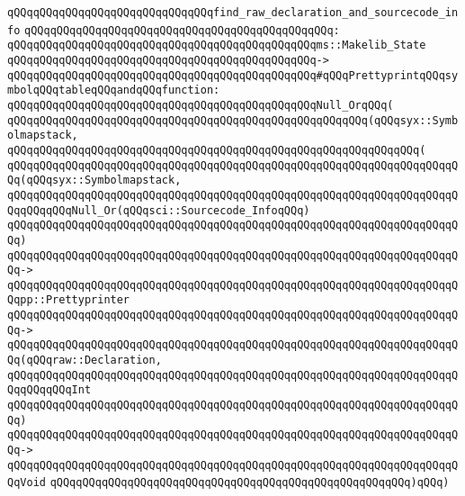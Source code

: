 \newline
\verb|qQQqqQQqqQQqqQQqqQQqqQQqqQQqqQQqfind_raw_declaration_and_sourcecode_info|\newline
\verb|qQQqqQQqqQQqqQQqqQQqqQQqqQQqqQQqqQQqqQQqqQQqqQQq:|\newline
\verb|qQQqqQQqqQQqqQQqqQQqqQQqqQQqqQQqqQQqqQQqqQQqqQQqms::Makelib_State|\newline
\verb|qQQqqQQqqQQqqQQqqQQqqQQqqQQqqQQqqQQqqQQqqQQqqQQq->|\newline
\verb|qQQqqQQqqQQqqQQqqQQqqQQqqQQqqQQqqQQqqQQqqQQqqQQq#qQQqPrettyprintqQQqsymbolqQQqtableqQQqandqQQqfunction:|\newline
\verb|qQQqqQQqqQQqqQQqqQQqqQQqqQQqqQQqqQQqqQQqqQQqqQQqNull_OrqQQq(|\newline
\verb|qQQqqQQqqQQqqQQqqQQqqQQqqQQqqQQqqQQqqQQqqQQqqQQqqQQqqQQq(qQQqsyx::Symbolmapstack,|\newline
\verb|qQQqqQQqqQQqqQQqqQQqqQQqqQQqqQQqqQQqqQQqqQQqqQQqqQQqqQQqqQQqqQQq(|\newline
\verb|qQQqqQQqqQQqqQQqqQQqqQQqqQQqqQQqqQQqqQQqqQQqqQQqqQQqqQQqqQQqqQQqqQQqqQQq(qQQqsyx::Symbolmapstack,|\newline
\verb|qQQqqQQqqQQqqQQqqQQqqQQqqQQqqQQqqQQqqQQqqQQqqQQqqQQqqQQqqQQqqQQqqQQqqQQqqQQqqQQqNull_Or(qQQqsci::Sourcecode_InfoqQQq)|\newline
\verb|qQQqqQQqqQQqqQQqqQQqqQQqqQQqqQQqqQQqqQQqqQQqqQQqqQQqqQQqqQQqqQQqqQQqqQQq)|\newline
\verb|qQQqqQQqqQQqqQQqqQQqqQQqqQQqqQQqqQQqqQQqqQQqqQQqqQQqqQQqqQQqqQQqqQQqqQQq->|\newline
\verb|qQQqqQQqqQQqqQQqqQQqqQQqqQQqqQQqqQQqqQQqqQQqqQQqqQQqqQQqqQQqqQQqqQQqqQQqpp::Prettyprinter|\newline
\verb|qQQqqQQqqQQqqQQqqQQqqQQqqQQqqQQqqQQqqQQqqQQqqQQqqQQqqQQqqQQqqQQqqQQqqQQq->|\newline
\verb|qQQqqQQqqQQqqQQqqQQqqQQqqQQqqQQqqQQqqQQqqQQqqQQqqQQqqQQqqQQqqQQqqQQqqQQq(qQQqraw::Declaration,|\newline
\verb|qQQqqQQqqQQqqQQqqQQqqQQqqQQqqQQqqQQqqQQqqQQqqQQqqQQqqQQqqQQqqQQqqQQqqQQqqQQqqQQqInt|\newline
\verb|qQQqqQQqqQQqqQQqqQQqqQQqqQQqqQQqqQQqqQQqqQQqqQQqqQQqqQQqqQQqqQQqqQQqqQQq)|\newline
\verb|qQQqqQQqqQQqqQQqqQQqqQQqqQQqqQQqqQQqqQQqqQQqqQQqqQQqqQQqqQQqqQQqqQQqqQQq->|\newline
\verb|qQQqqQQqqQQqqQQqqQQqqQQqqQQqqQQqqQQqqQQqqQQqqQQqqQQqqQQqqQQqqQQqqQQqqQQqVoid|\newline
\verb|qQQqqQQqqQQqqQQqqQQqqQQqqQQqqQQqqQQqqQQqqQQqqQQqqQQqqQQq)qQQq)|\newline
